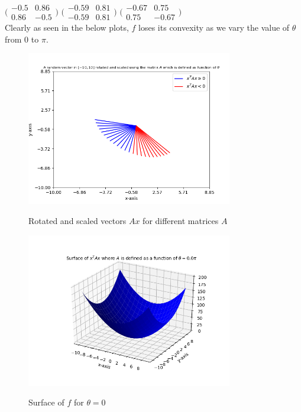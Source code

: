 \documentclass{article}
\begin{document}
\begin{flushleft}
 $\Big(\begin{matrix}-0.5 & 0.86 \\ 0.86 & -0.5\end{matrix}\Big)$
 $\Big(\begin{matrix}-0.59 & 0.81 \\ -0.59 & 0.81\end{matrix}\Big)$
 $\Big(\begin{matrix}-0.67 & 0.75 \\ 0.75 & -0.67\end{matrix}\Big)$\\
 Clearly as seen in the below plots, $f$ loses its convexity as we vary the value of $\theta$ from $0$ to $\pi$.\\
 \begin{figure}[htp]
         \centering
         \includegraphics[width=9cm]{psd.png}\\
         \caption{Rotated and scaled vectors $Ax$ for different matrices $A$}
 \end{figure}
 \begin{figure}[htp]
         \centering
         \includegraphics[width=9cm]{0pi.png}\\
         \caption{Surface of $f$ for $\theta=0$}
 \end{figure}

\end{flushleft}
\end{document}
